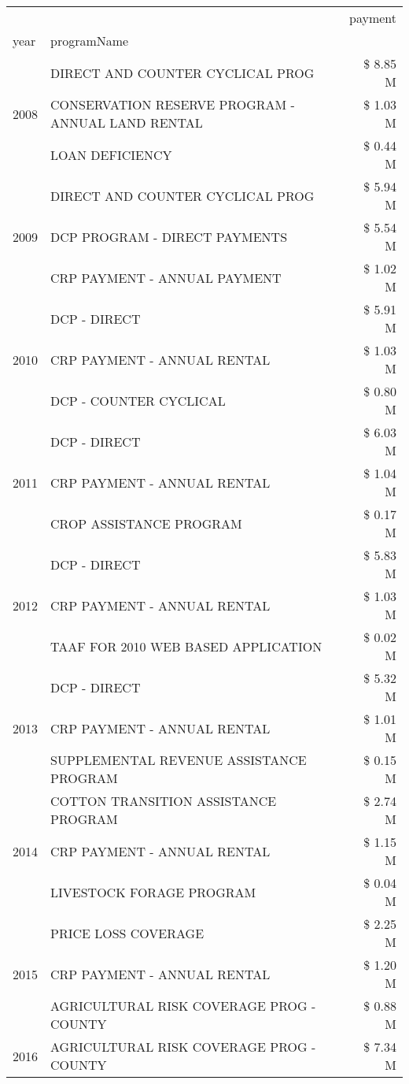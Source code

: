 \begin{tabular}{llr}
\toprule
 &  & payment \\
year & programName &  \\
\midrule
\multirow[t]{3}{*}{2008} & DIRECT AND COUNTER CYCLICAL PROG & \$ 8.85 M \\
 & CONSERVATION RESERVE PROGRAM - ANNUAL LAND RENTAL & \$ 1.03 M \\
 & LOAN DEFICIENCY & \$ 0.44 M \\
\cline{1-3}
\multirow[t]{3}{*}{2009} & DIRECT AND COUNTER CYCLICAL PROG & \$ 5.94 M \\
 & DCP PROGRAM - DIRECT PAYMENTS & \$ 5.54 M \\
 & CRP PAYMENT - ANNUAL PAYMENT & \$ 1.02 M \\
\cline{1-3}
\multirow[t]{3}{*}{2010} & DCP - DIRECT & \$ 5.91 M \\
 & CRP PAYMENT - ANNUAL RENTAL & \$ 1.03 M \\
 & DCP - COUNTER CYCLICAL & \$ 0.80 M \\
\cline{1-3}
\multirow[t]{3}{*}{2011} & DCP - DIRECT & \$ 6.03 M \\
 & CRP PAYMENT - ANNUAL RENTAL & \$ 1.04 M \\
 & CROP ASSISTANCE PROGRAM & \$ 0.17 M \\
\cline{1-3}
\multirow[t]{3}{*}{2012} & DCP - DIRECT & \$ 5.83 M \\
 & CRP PAYMENT - ANNUAL RENTAL & \$ 1.03 M \\
 & TAAF FOR 2010 WEB BASED APPLICATION & \$ 0.02 M \\
\cline{1-3}
\multirow[t]{3}{*}{2013} & DCP - DIRECT & \$ 5.32 M \\
 & CRP PAYMENT - ANNUAL RENTAL & \$ 1.01 M \\
 & SUPPLEMENTAL REVENUE ASSISTANCE PROGRAM & \$ 0.15 M \\
\cline{1-3}
\multirow[t]{3}{*}{2014} & COTTON TRANSITION ASSISTANCE PROGRAM & \$ 2.74 M \\
 & CRP PAYMENT - ANNUAL RENTAL & \$ 1.15 M \\
 & LIVESTOCK FORAGE PROGRAM & \$ 0.04 M \\
\cline{1-3}
\multirow[t]{3}{*}{2015} & PRICE LOSS COVERAGE & \$ 2.25 M \\
 & CRP PAYMENT - ANNUAL RENTAL & \$ 1.20 M \\
 & AGRICULTURAL RISK COVERAGE PROG - COUNTY & \$ 0.88 M \\
\cline{1-3}
\multirow[t]{3}{*}{2016} & AGRICULTURAL RISK COVERAGE PROG - COUNTY & \$ 7.34 M \\

\end{tabular}
